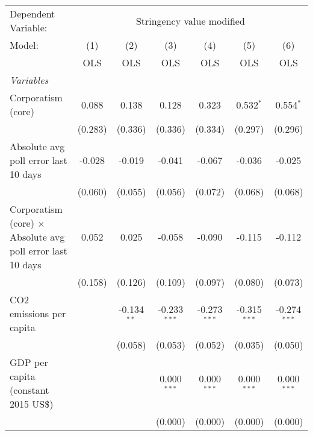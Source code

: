 
\begingroup
\centering
\begin{tabular}{lcccccc}
   \toprule
   Dependent Variable: & \multicolumn{6}{c}{Stringency value modified}\\
   Model:                                                            & (1)     & (2)           & (3)            & (4)            & (5)            & (6)\\  
                                                                     &  OLS    & OLS           & OLS            & OLS            & OLS            & OLS\\  
   \midrule
   \emph{Variables}\\
   Corporatism (core)                                                & 0.088   & 0.138         & 0.128          & 0.323          & 0.532$^{*}$    & 0.554$^{*}$\\   
                                                                     & (0.283) & (0.336)       & (0.336)        & (0.334)        & (0.297)        & (0.296)\\   
   Absolute avg poll error last 10 days                              & -0.028  & -0.019        & -0.041         & -0.067         & -0.036         & -0.025\\   
                                                                     & (0.060) & (0.055)       & (0.056)        & (0.072)        & (0.068)        & (0.068)\\   
   Corporatism (core) $\times$ Absolute avg poll error last 10 days  & 0.052   & 0.025         & -0.058         & -0.090         & -0.115         & -0.112\\   
                                                                     & (0.158) & (0.126)       & (0.109)        & (0.097)        & (0.080)        & (0.073)\\   
   CO2 emissions per capita                                          &         & -0.134$^{**}$ & -0.233$^{***}$ & -0.273$^{***}$ & -0.315$^{***}$ & -0.274$^{***}$\\   
                                                                     &         & (0.058)       & (0.053)        & (0.052)        & (0.035)        & (0.050)\\   
   GDP per capita (constant 2015 US\$)                               &         &               & 0.000$^{***}$  & 0.000$^{***}$  & 0.000$^{***}$  & 0.000$^{***}$\\   
                                                                     &         &               & (0.000)        & (0.000)        & (0.000)        & (0.000)\\   

\end{tabular}
